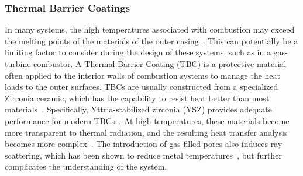 \subsubsection{Thermal Barrier Coatings}
In many systems, the high temperatures associated with combustion may exceed the melting points of the materials of the outer casing~\cite{Flamant2019OpportunitiesCoatings}. This can potentially be a limiting factor to consider during the design of these systems, such as in a gas-turbine combustor.
A Thermal Barrier Coating (TBC) is a protective material often applied to the interior walls of combustion systems to manage the heat loads to the outer surfaces. 
TBCs are usually constructed from a specialized Zirconia ceramic, which has the capability to resist heat
better than most materials~\cite{Miller1997ThermalDirections}. Specifically, Yttria-stabilized zirconia (YSZ) provides adequate performance for modern TBCs~\cite{Padture2002ThermalApplications,Padture2016AdvancedPropulsion}. At high temperatures, these materials become more transparent to thermal radiation, and the resulting heat transfer analysis becomes more complex~\cite{Howell2010ThermalTransfer, Siegel1998AnalysisCoatings}. The
introduction of gas-filled pores also induces ray scattering, which has been shown to reduce metal temperatures~\cite{Boissonnet2019EvolutionTemperature,Spuckler1996Two-FluxLayers}, but further complicates the understanding of the system.

